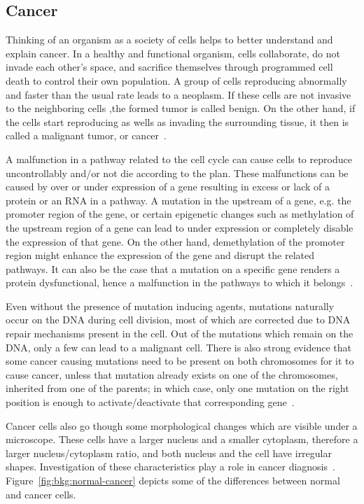 \subsection{Cancer}
\label{sec:bkg:cancer}
Thinking of an organism as a society of cells helps to better understand and explain cancer. In a healthy and functional organism, cells collaborate, do not invade each other's space, and sacrifice themselves through programmed cell death to control their own population. A group of cells reproducing abnormally and faster than the usual rate leads to a neoplasm. If these cells are not invasive to the neighboring cells ,the formed tumor is called benign. On the other hand, if the cells start reproducing as wells as invading the surrounding tissue, it then is called a malignant tumor, or cancer~\cite[Ch. 20]{the-cell}.

A malfunction in a pathway related to the cell cycle can cause cells to reproduce uncontrollably and/or not die according to the plan. These malfunctions can be caused by over or under expression of a gene resulting in excess or lack of a protein or an RNA in a pathway. A mutation in the upstream of a gene, e.g. the promoter region of the gene, or certain epigenetic changes such as methylation of the upstream region of a gene can lead to under expression or completely disable the expression of that gene. On the other hand, demethylation of the promoter region might enhance the expression of the gene and disrupt the related pathways. It can also be the case that a mutation on a specific gene renders a protein dysfunctional, hence a malfunction in the pathways to which it belongs~\cite{esteller2008epigenetics}.

Even without the presence of mutation inducing agents, mutations naturally occur on the DNA during cell division, most of which are corrected due to DNA repair mechanisms present in the cell. Out of the mutations which remain on the DNA, only a few can lead to a malignant cell. There is also strong evidence that some cancer causing mutations need to be present on both chromosomes for it to cause cancer, unless that mutation already exists on one of the chromosomes, inherited from one of the parents; in which case, only one mutation on the right position is enough to activate/deactivate that corresponding gene~\cite{the-emperor-of-all-maladies}.

Cancer cells also go though some morphological changes which are visible under a microscope. These cells have a larger nucleus and a smaller cytoplasm, therefore a larger nucleus/cytoplasm ratio, and both nucleus and the cell have irregular shapes. Investigation of these characteristics play a role in cancer diagnosis~\cite{baba2007tumor}. Figure~\ref{fig:bkg:normal-cancer} depicts some of the differences between normal and cancer cells.

